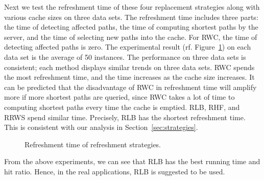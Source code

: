 Next we test the refreshment time of these four replacement strategies along with various cache sizes on three data sets.
The refreshment time includes three parts: the time of detecting affected paths, the time of computing shortest paths by the server, and the time of selecting new paths into the cache. For RWC, the time of detecting affected paths is zero.
The experimental result (rf. Figure~\ref{fig:comparison-overall-time}) on each data set is the average of 50 instances.
The performance on three data sets is consistent; each method displays similar trends on three data sets.
RWC spends the most refreshment time, and the time increases as the cache size increases. It can be predicted that the disadvantage of RWC in refreshment time will amplify more if more shortest paths are queried, since RWC takes a lot of time to computing shortest paths every time the cache is emptied.
RLB, RHF, and RRWS spend similar time.
Precisely, RLB has the shortest refreshment time.
This is consistent with our analysis in Section~\ref{sec:strategies}.
 \begin{figure}[htbp]
\centering
   \caption{Refreshment time of refreshment strategies.}
   \label{fig:comparison-overall-time}
\end{figure}

From the above experiments, we can see that RLB has the best running time and hit ratio. Hence, in the real applications, RLB is suggested to be used.



